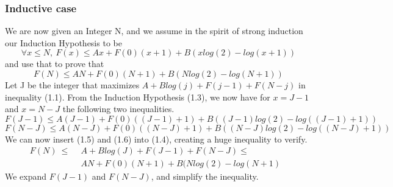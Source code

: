 \subsubsection{Inductive case}
We are now given an Integer N, and we assume in the spirit of strong induction our Induction Hypothesis to be
\begin{equation}
	\forall x \le N,\ F(x) \le Ax + F(0)(x+1) + B(xlog(2)-log(x+1)) 	
\end{equation}
and use that to prove that 
\begin{equation}
	F(N) \le AN + F(0)(N+1) + B(Nlog(2)-log(N+1)) 	
\end{equation}
Let J be the integer that maximizes $A + Blog(j) + F(j-1) + F(N-j)$ in inequality (1.1). From the Induction Hypothesis (1.3), we now have for $x=J-1$ and $x=N-J$ the following two inequalities.
\begin{equation}
	F(J-1) \le A(J-1) + F(0)((J-1)+1) + B((J-1)log(2)-log((J-1)+1)) 	
\end{equation}
\begin{equation}
	F(N-J) \le A(N-J) + F(0)((N-J)+1) + B((N-J)log(2)-log((N-J)+1)) 	
\end{equation}
We can now insert (1.5) and (1.6) into (1.4), creating a huge inequality to verify.
\begin{align*}
	F(N)\ \le&\ \  A + Blog(J) + F(J-1) + F(N-J) \le   & \\
	         &\ \  AN + F(0)(N+1) + B(Nlog(2)-log(N+1) & 
\end{align*}
We expand $F(J-1)$ and $F(N-J)$, and simplify the inequality.

